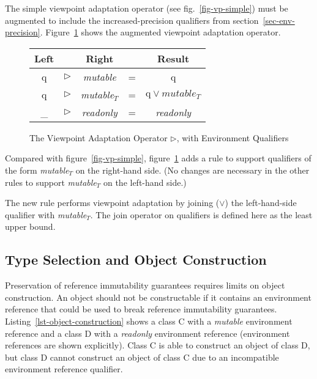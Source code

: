 The simple viewpoint adaptation operator (see fig.~\ref{fig-vp-simple})
must be augmented to include the increased-precision qualifiers from section~\ref{sec-env-precision}.
Figure~\ref{fig-vp-inc-prec} shows the augmented viewpoint adaptation operator.

\begin{figure}[htp]
	\center
	\begin{tabular}{ccccc}
		Left & & Right & & Result \\
		\hline
		q & $\triangleright$ & {\em mutable} & = & q \\
		q & $\triangleright$ & \mbox{{\em mutable}$_T$} & = & $\text{q} \lor mutable_T$ \\
		\_ & $\triangleright$ & {\em readonly} & = & {\em readonly} \\
	\end{tabular}
	\caption{The Viewpoint Adaptation Operator $\triangleright$, with Environment Qualifiers}
	\label{fig-vp-inc-prec}
\end{figure}

Compared with figure~\ref{fig-vp-simple},
figure~\ref{fig-vp-inc-prec} adds a rule to support qualifiers of the form \mbox{{\em mutable}$_T$}
on the right-hand side. (No changes are necessary in the other rules to support
\mbox{{\em mutable}$_T$} on the left-hand side.)

The new rule performs viewpoint adaptation by joining ($\lor$) the left-hand-side qualifier
with \mbox{{\em mutable}$_T$}. The join operator on qualifiers is defined here as
the least upper bound.


\subsection{Type Selection and Object Construction} \label{sec-type-sel}

Preservation of reference immutability guarantees requires limits on object
construction. An object should not be constructable if it contains
an environment reference that could be used to break reference immutability
guarantees. Listing~\ref{lst-object-construction} shows a class {\cd C} with
a {\em mutable} environment reference and a class {\cd D} with a {\em readonly}
environment reference (environment references are shown explicitly).
Class {\cd C} is able to construct an object of class {\cd D},
but class {\cd D} cannot construct an object of class {\cd C}
due to an incompatible environment reference qualifier.

